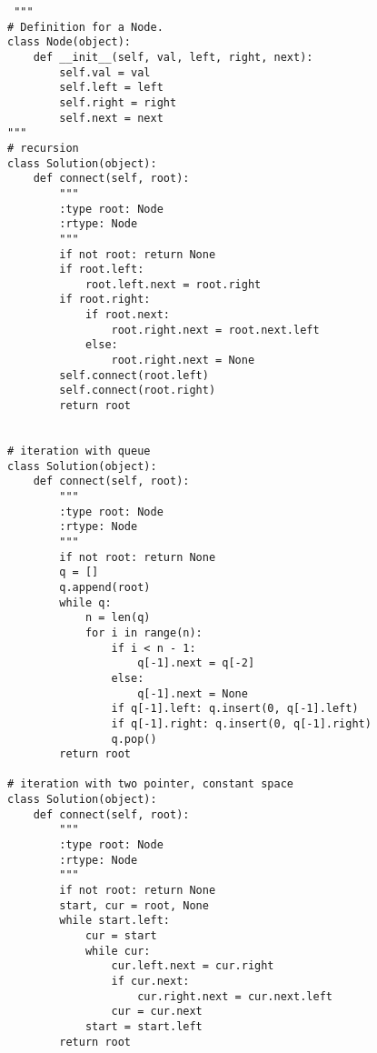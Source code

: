 \begin{lstlisting}
 """
# Definition for a Node.
class Node(object):
    def __init__(self, val, left, right, next):
        self.val = val
        self.left = left
        self.right = right
        self.next = next
"""
# recursion
class Solution(object):
    def connect(self, root):
        """
        :type root: Node
        :rtype: Node
        """
        if not root: return None
        if root.left:
            root.left.next = root.right
        if root.right:
            if root.next:
                root.right.next = root.next.left
            else:
                root.right.next = None
        self.connect(root.left)
        self.connect(root.right)
        return root
        

# iteration with queue
class Solution(object):
    def connect(self, root):
        """
        :type root: Node
        :rtype: Node
        """
        if not root: return None
        q = []
        q.append(root)
        while q:
            n = len(q)
            for i in range(n):
                if i < n - 1:
                    q[-1].next = q[-2]
                else:
                    q[-1].next = None
                if q[-1].left: q.insert(0, q[-1].left)
                if q[-1].right: q.insert(0, q[-1].right)
                q.pop()
        return root
                
# iteration with two pointer, constant space
class Solution(object):
    def connect(self, root):
        """
        :type root: Node
        :rtype: Node
        """
        if not root: return None
        start, cur = root, None
        while start.left:
            cur = start
            while cur:
                cur.left.next = cur.right
                if cur.next:
                    cur.right.next = cur.next.left
                cur = cur.next
            start = start.left
        return root
\end{lstlisting}
  

